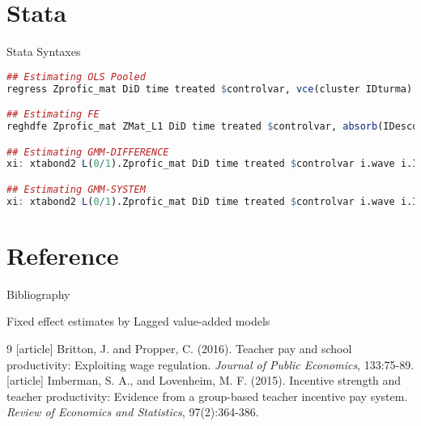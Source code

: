 \documentclass{beamer}
\begin{document}
\section{Stata} 
\begin{frame}[fragile, label=Stata]{Stata Syntaxes}
\vspace{-28pt} \flushright \hyperlink{Main3}{\beamerbutton{\textcolor{red}{Back}}}
\vspace{5pt}
\begin{lstlisting}[language=R]
## Estimating OLS Pooled
regress Zprofic_mat DiD time treated $controlvar, vce(cluster IDturma)

## Estimating FE
reghdfe Zprofic_mat ZMat_L1 DiD time treated $controlvar, absorb(IDescola wave) vce(cluster IDturma)

## Estimating GMM-DIFFERENCE 
xi: xtabond2 L(0/1).Zprofic_mat DiD time treated $controlvar i.wave i.IDescola, gmmstyle(L1.Zprofic_mat) ivstyle(DiD time treated $controlvar i.wave i.IDescola) robust twostep cluster(IDturma) noleveleq

## Estimating GMM-SYSTEM 
xi: xtabond2 L(0/1).Zprofic_mat DiD time treated $controlvar i.wave i.IDescola, gmmstyle(L1.Zprofic_mat) ivstyle(DiD time treated $controlvar i.wave i.IDescola) robust twostep cluster(IDturma)
\end{lstlisting}
\end{frame}




\section{Reference}

\begin{frame}[label=Bibliography1]{Bibliography}
\vspace{-105pt} \flushright \hyperlink{Mirror}{\beamerbutton{\textcolor{red}{Mirror}}}
\vspace{50pt}
\begin{block}{\centering Fixed effect estimates by Lagged value-added models}
\vspace{-17pt} \flushright \hyperlink{Main6}{\beamerbutton{\textcolor{red}{Back}}}
\vspace{5pt}
\begin{thebibliography}{9}
[article]
\tiny {} Britton, J. and Propper, C. (2016). Teacher pay and school productivity: Exploiting wage
regulation. \textit{Journal of Public Economics}, 133:75-89.
[article]
\tiny {} Imberman, S. A., and Lovenheim, M. F. (2015). Incentive strength and teacher productivity: Evidence from a group-based teacher incentive pay system. \textit{Review of Economics and Statistics}, 97(2):364-386.
\end{thebibliography}
\end{block}
\end{frame}
\end{document}
